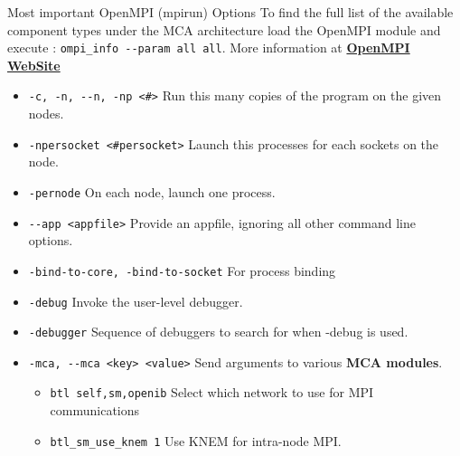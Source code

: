 \documentclass[final,t]{beamer}
\begin{document}
\begin{frame}[fragile]{}
\begin{columns}[t]
\begin{column}{.35\linewidth}
      
      \begin{block}{Most important OpenMPI (mpirun) Options}
              To find the full list of the available component types under the MCA architecture load the OpenMPI module and execute : \verb|ompi_info --param all all|. More information at \textbf{\href{http://www.open-mpi.org/doc/v1.6/man1/mpirun.1.php}{OpenMPI WebSite}} \\
      \begin{itemize}
         \item \verb|-c, -n, --n, -np <#>| Run this many copies of the program on the given nodes. 
         \item \verb|-npersocket <#persocket>| Launch this processes for each sockets on the node.
         \item \verb|-pernode| On each node, launch one process.
         \item \verb|--app <appfile>| Provide an appfile, ignoring all other command line options.
         \item \verb|-bind-to-core, -bind-to-socket| For process binding 
         \item \verb|-debug| Invoke the user-level debugger.
         \item \verb|-debugger| Sequence of debuggers to search for when -debug is used.
         \item \verb|-mca, --mca <key> <value>| Send arguments to various \textbf{MCA modules}.
         \begin{itemize}
         \item \verb|btl self,sm,openib| Select which network to use for MPI communications
         \item \verb|btl_sm_use_knem 1| Use KNEM for intra-node MPI.

\end{itemize}
\end{itemize}
\end{block}
\end{column}
\end{columns}
\end{frame}
\end{document}
